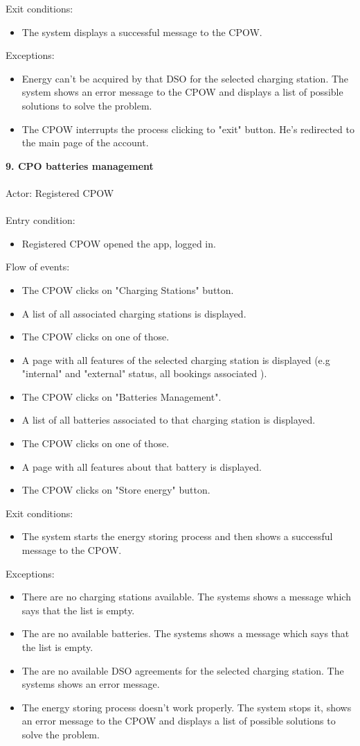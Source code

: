 \documentclass[a4paper]{report}
\begin{document}
Exit conditions: 
\begin{itemize}
\item The system displays a successful message to the CPOW. 
\end{itemize} 
Exceptions: 
\begin{itemize}
\item Energy can't be acquired by that DSO for the selected charging station. The system shows an error message to the CPOW and displays a list of possible solutions to solve the problem.
\item The CPOW interrupts the process clicking to "exit" button. He's redirected to the main page of the account.
\end{itemize}
\textbf{9. CPO batteries management}\label{uc:8}
\\ \\
Actor: Registered CPOW \\ \\
Entry condition: 
\begin{itemize}
\item Registered CPOW opened the app, logged in.
\end{itemize}
Flow of events:
\begin{itemize}
\item The CPOW clicks on "Charging Stations" button.
\item A list of all associated charging stations is displayed.
\item The CPOW clicks on one of those.
\item A page with all features of the selected charging station is displayed (e.g "internal" and "external" status, all bookings associated ).
\item The CPOW clicks on "Batteries Management".
\item A list of all batteries associated to that charging station is displayed.
\item The CPOW clicks on one of those.
\item A page with all features about that battery is displayed.
\item The CPOW clicks on "Store energy" button.
\end{itemize}
Exit conditions: 
\begin{itemize}
\item The system starts the energy storing process and then shows a successful message to the CPOW.
\end{itemize} 
Exceptions: 
\begin{itemize}
\item There are no charging stations available. The systems shows a message which says that
the list is empty.
\item The are no available batteries. The systems shows a message which says that the list is empty.
\item The are no available DSO agreements for the selected charging station. The systems shows an error message.
\item The energy storing process doesn't work properly. The system stops it, shows an error message to the CPOW and displays a list of possible solutions to solve the problem.
\end{itemize}
\end{document}

